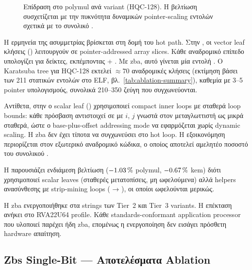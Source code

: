 \begin{figure}[htbp]
  \centering
  
  \caption[Επίδραση Zba στο polymul instret ανά variant (HQC-128)]{Επίδραση  στο polymul \instret ανά variant (HQC-128).
    Η βελτίωση συσχετίζεται με την πυκνότητα δυναμικών pointer-scaling
    εντολών σχετικά με το συνολικό \instret.}
  \label{fig:zba-ablation}
\end{figure}

Η ερμηνεία της ασυμμετρίας βρίσκεται στη δομή του hot path. Στην
, οι vector leaf κλήσεις ()
λειτουργούν σε pointer-addressed array slices. Κάθε αναδρομικό επίπεδο
υπολογίζει  για  δείκτες, εκπέμποντας
 + . Με \gls{zba}, αυτό
γίνεται μία εντολή . Ο Karatsuba tree για HQC-128 εκτελεί
$\approx 70$ αναδρομικές κλήσεις (εκτίμηση βάσει των \num{211} στατικών
 εντολών στο ELF, βλ.\ \cref{tab:ablation-summary}), καθεμία με 3–5 pointer υπολογισμούς, συνολικά 210–350 ζεύγη  που συγχωνεύονται.

Αντίθετα, στην  ο scalar leaf ()
χρησιμοποιεί compact inner loops με σταθερά loop bounds: κάθε πρόσβαση
αντιστοιχεί σε  με $i$, $j$ γνωστά στον μεταγλωττιστή ως
μικρά σταθερά, ώστε ο base-plus-offset addressing mode να εφαρμόζεται
χωρίς dynamic scaling. Η \gls{zba} δεν έχει τίποτα να συγχωνεύσει στο
hot loop. Η εξοικονόμηση περιορίζεται στον εξωτερικό αναδρομικό κώδικα,
ο οποίος αποτελεί αμελητέο ποσοστό του συνολικού \instret.

Η  παρουσιάζει ενδιάμεση βελτίωση ($-\SI{1.03}{\percent}$
polymul, $-\SI{0.67}{\percent}$ \gls{kem}) διότι χρησιμοποιεί scalar \clmul leaves
(σταθερές μετατοπίσεις, μη ωφελούμενα) αλλά \RVV helpers ανασύνθεσης με strip-mining loops ( → ), οι οποίοι
ωφελούνται μερικώς.

Η \gls{zba} ενεργοποιήθηκε στα  strings των Tier~2 και
Tier~3 variants. Η επέκταση ανήκει στο RVA22U64 profile. Κάθε
standards-conformant application processor που υλοποιεί \RVV παρέχει
ήδη \gls{zba}, επομένως η ενεργοποίηση δεν εισάγει πρόσθετη hardware
απαίτηση.

\subsection{Zbs Single-Bit — Αποτελέσματα Ablation}
\label{ssec:zbs-ablation}

